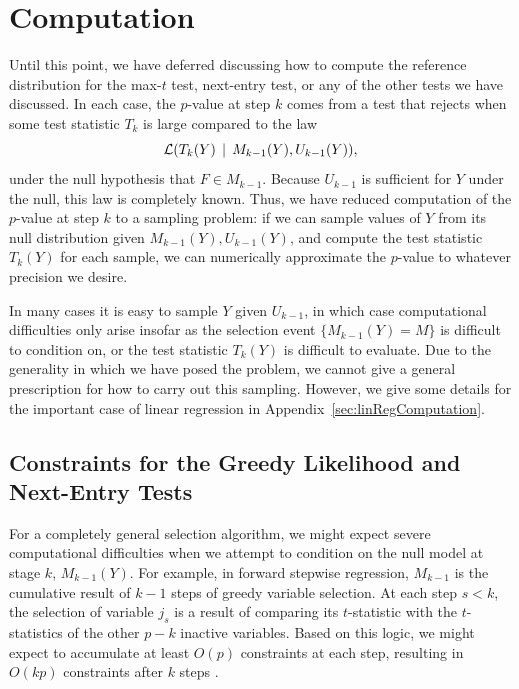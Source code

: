 \documentclass{article}
\begin{document}
\section{Computation}
\label{sec:computation}

Until this point, we have deferred discussing how to compute the reference distribution for the max-$t$ test, next-entry test, or any of the other tests we have discussed. In each case, the $p$-value at step $k$ comes from a test that rejects when some test statistic $T_k$ is large compared to the law
\begin{equation}\label{eq:genDist}
\mathcal{L}(T_k(Y) \,\mid\, M_{k-1}(Y), U_{k-1}(Y)),
\end{equation}
under the null hypothesis that $F\in M_{k-1}$. Because $U_{k-1}$ is sufficient for $Y$ under the null, this law is completely known. Thus, we have reduced computation of the $p$-value at step $k$ to a sampling problem: if we can sample values of $Y$ from its null distribution given $M_{k-1}(Y), U_{k-1}(Y)$, and compute the test statistic $T_k(Y)$ for each sample, we can numerically approximate the $p$-value to whatever precision we desire.

In many cases it is easy to sample $Y$ given $U_{k-1}$, in which case computational difficulties only arise insofar as the selection event $\{M_{k-1}(Y)=M\}$ is difficult to condition on, or the test statistic $T_k(Y)$ is difficult to evaluate. Due to the generality in which we have posed the problem, we cannot give a general prescription for how to carry out this sampling. However, we give some details for the important case of linear regression in Appendix~\ref{sec:linRegComputation}.


\subsection{Constraints for the Greedy Likelihood and Next-Entry Tests}\label{sec:constraints}

For a completely general selection algorithm, we might expect severe computational difficulties when we attempt to condition on the null model at stage $k$, $M_{k-1}(Y)$. For example, in forward stepwise regression, $M_{k-1}$ is the cumulative result of $k-1$ steps of greedy variable selection. At each step $s<k$, the selection of variable $j_s$ is a result of comparing its $t$-statistic with the $t$-statistics of the other $p-k$ inactive variables. Based on this logic, we might expect to accumulate at least $O(p)$ constraints at each step, resulting in $O(kp)$ constraints after $k$ steps \citep{tibshirani2014exact}.
\end{document}

